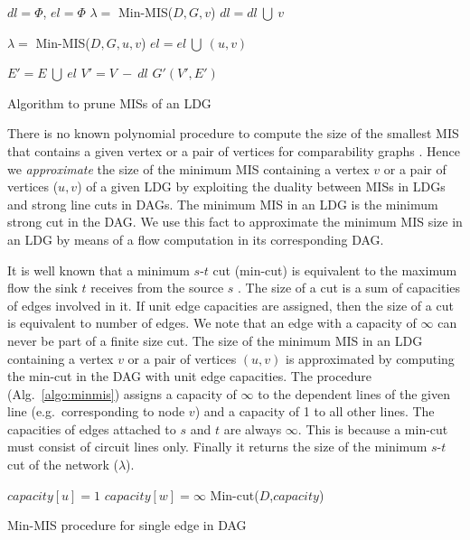 \documentclass[journal]{IEEEtran}
\begin{document}
\begin{algorithm} 
    \BlankLine $dl = \Phi$, $el = \Phi$\;  { $\lambda = $ Min-MIS($D, G, v$)\;  { $dl = dl~\bigcup~v$\; } }

{
$\lambda = $ Min-MIS($D, G, u, v$)\;
{
$el = el ~\bigcup~(u,v)$\;
}
}

$E' = E ~\bigcup~ el$\;
$V' = V~-~dl$\;
\Return $G'(V',E')$\;
\caption{Algorithm to prune MISs of an LDG}
\label{algo:prune} 
\end{algorithm} 

There is no known polynomial procedure to compute the size of the smallest MIS that contains a given vertex or a pair of vertices for comparability graphs \cite{corneil1984clustering}. Hence we \emph{approximate} the size of the minimum MIS containing a vertex $v$ or a pair of vertices ($u,v$) of a given LDG by exploiting the duality between MISs in LDGs and strong line cuts in DAGs. The minimum MIS in an LDG is the minimum strong cut in the DAG. We use this fact to approximate the minimum MIS size in an LDG by means of a flow computation in its corresponding DAG.

It is well known that a minimum $s$-$t$ cut (min-cut) is equivalent to the maximum flow the sink $t$ receives from the source $s$ \cite{cormen2001introduction,ford1962flow}. The size of a cut is a sum of capacities of edges involved in it. If unit edge capacities are assigned, then the size of a cut is equivalent to number of edges.  We note that an edge with a capacity of $\infty$ can never be part of a finite size cut.  The size of the minimum MIS in an LDG containing a vertex $v$ or a pair of vertices $(u,v)$ is approximated by computing the min-cut in the DAG with unit edge capacities. The procedure (Alg.\ \ref{algo:minmis}) assigns a capacity of $\infty$ to the dependent lines of the given line (e.g.\ corresponding to node $v$) and a capacity of 1 to all other lines. The capacities of edges attached to $s$ and $t$ are always $\infty$. This is because a min-cut must consist of circuit lines only.  Finally it returns the size of the minimum $s$-$t$ cut of the network ($\lambda$).

\begin{algorithm} 
\BlankLine 
{}
{
$capacity[u] = 1$\;
}
{
$capacity[w] = \infty$\;
}
\Return Min-cut($D$,$capacity$)\;
\caption{Min-MIS procedure for single edge in DAG}
\label{algo:minmis} 
\end{algorithm} 
\end{document}
